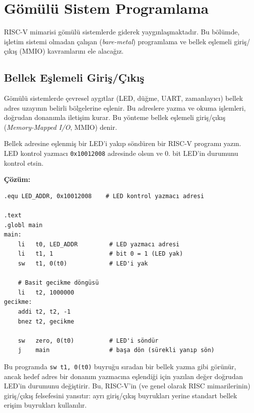 \section{Gömülü Sistem Programlama}
\label{sec:gomulu-sistem}

RISC-V mimarisi gömülü sistemlerde giderek yaygınlaşmaktadır. Bu bölümde, işletim sistemi olmadan çalışan (\emph{bare-metal}) programlama ve bellek eşlemeli giriş/çıkış (MMIO) kavramlarını ele alacağız.

\subsection{Bellek Eşlemeli Giriş/Çıkış}
\label{subsec:mmio}

Gömülü sistemlerde çevresel aygıtlar (LED, düğme, UART, zamanlayıcı) bellek adres uzayının belirli bölgelerine eşlenir. Bu adreslere yazma ve okuma işlemleri, doğrudan donanımla iletişim kurar. Bu yönteme bellek eşlemeli giriş/çıkış (\emph{Memory-Mapped I/O}, MMIO) denir.

\begin{ornek}[4.18]
\label{orn:mmio-led}
Bellek adresine eşlenmiş bir LED'i yakıp söndüren bir RISC-V programı yazın. LED kontrol yazmacı \texttt{0x10012008} adresinde olsun ve 0. bit LED'in durumunu kontrol etsin.

\textbf{Çözüm:}

\begin{lstlisting}[style=riscv]
.equ LED_ADDR, 0x10012008    # LED kontrol yazmacı adresi

.text
.globl main
main:
    li   t0, LED_ADDR         # LED yazmacı adresi
    li   t1, 1                # bit 0 = 1 (LED yak)
    sw   t1, 0(t0)            # LED'i yak

    # Basit gecikme döngüsü
    li   t2, 1000000
gecikme:
    addi t2, t2, -1
    bnez t2, gecikme

    sw   zero, 0(t0)          # LED'i söndür
    j    main                 # başa dön (sürekli yanıp sön)
\end{lstlisting}

Bu programda \texttt{sw t1, 0(t0)} buyruğu sıradan bir bellek yazma gibi görünür, ancak hedef adres bir donanım yazmacına eşlendiği için yazılan değer doğrudan LED'in durumunu değiştirir. Bu, RISC-V'in (ve genel olarak RISC mimarilerinin) giriş/çıkış felsefesini yansıtır: ayrı giriş/çıkış buyrukları yerine standart bellek erişim buyrukları kullanılır.
\end{ornek}

